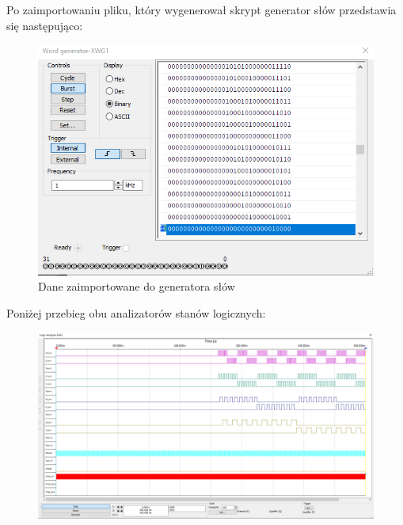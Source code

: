 \documentclass[a4paper]{article}
\begin{document}
\pagebreak
Po zaimportowaniu pliku, który wygenerował skrypt generator słów przedstawia się następująco:
\begin{figure}[H]
    \centering

    \includegraphics{setter_test_word_generator.png}
    \caption{Dane zaimportowane do generatora słów}
\end{figure}

\pagebreak
Poniżej przebieg obu analizatorów stanów logicznych:
\begin{figure}[H]
    \centering
    \includegraphics[width=\textwidth]{component_test_logic_analyzer_xla2_setter.png}
\end{figure}
\end{document}
